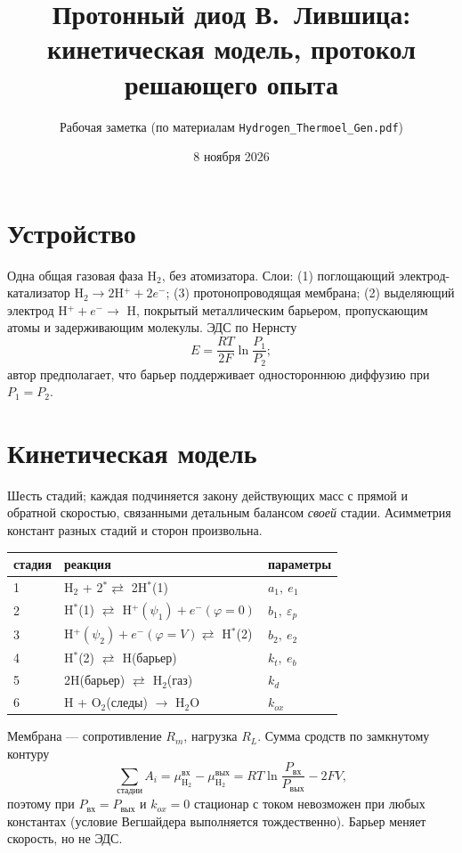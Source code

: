 \documentclass[11pt,a4paper]{article}
\title{Протонный диод В.~Лившица:\\ кинетическая модель, протокол решающего опыта}
\author{Рабочая заметка (по материалам \texttt{Hydrogen\_Thermoel\_Gen.pdf})}
\date{8 ноября 2026}
\begin{document}
\maketitle

\section{Устройство}
Одна общая газовая фаза H$_2$, без атомизатора. Слои: (1) поглощающий электрод-катализатор
H$_2\to 2$H$^+ + 2e^-$; (3) протонопроводящая мембрана; (2) выделяющий электрод H$^+ + e^- \to$ H,
покрытый металлическим барьером, пропускающим атомы и задерживающим молекулы. ЭДС по Нернсту
\begin{equation}
E=\frac{RT}{2F}\ln\frac{P_1}{P_2};
\end{equation}
автор предполагает, что барьер поддерживает одностороннюю диффузию при $P_1=P_2$.

\section{Кинетическая модель}
Шесть стадий; каждая подчиняется закону действующих масс с прямой и обратной скоростью,
связанными детальным балансом \emph{своей} стадии. Асимметрия констант разных стадий и сторон произвольна.
\begin{center}
\begin{tabular}{lll}\toprule
стадия & реакция & параметры\\\midrule
1 & H$_2$ + 2$^*\rightleftarrows$ 2H$^*$(1) & $a_1,\ e_1$\\
2 & H$^*$(1) $\rightleftarrows$ H$^+(\psi_1)+e^-(\varphi{=}0)$ & $b_1,\ \varepsilon_p$\\
3 & H$^+(\psi_2)+e^-(\varphi{=}V)\rightleftarrows$ H$^*$(2) & $b_2,\ e_2$\\
4 & H$^*$(2) $\rightleftarrows$ H(барьер) & $k_t,\ e_b$\\
5 & 2H(барьер) $\rightleftarrows$ H$_2$(газ) & $k_d$\\
6 & H + O$_2$(следы) $\to$ H$_2$O & $k_{ox}$\\\bottomrule
\end{tabular}\end{center}
Мембрана --- сопротивление $R_m$, нагрузка $R_L$. Сумма сродств по замкнутому контуру
\begin{equation}
\sum_{\text{стадии}}A_i=\mu_{\mathrm{H_2}}^{\text{вх}}-\mu_{\mathrm{H_2}}^{\text{вых}}=RT\ln\frac{P_{\text{вх}}}{P_{\text{вых}}}-2FV,
\end{equation}
поэтому при $P_{\text{вх}}=P_{\text{вых}}$ и $k_{ox}=0$ стационар с током невозможен при любых константах
(условие Вегшайдера выполняется тождественно). Барьер меняет скорость, но не ЭДС.
\end{document}
